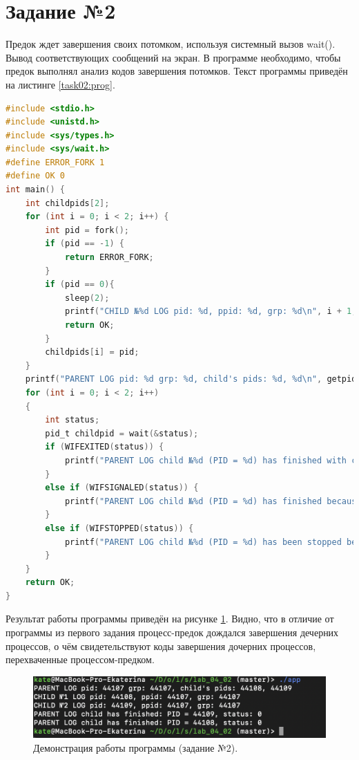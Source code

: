 \documentclass[12pt]{report}
\begin{document}
\section*{Задание №2}

Предок ждет завершения своих потомком, используя системный вызов wait(). Вывод соответствующих сообщений на экран. В программе необходимо, чтобы предок выполнял анализ кодов завершения потомков. Текст программы приведён на листинге \ref{task02:prog}.

\begin{lstlisting}[label=task02:prog,caption=Системный вызов wait(),language=C]
#include <stdio.h>
#include <unistd.h>
#include <sys/types.h>
#include <sys/wait.h>
#define ERROR_FORK 1
#define OK 0
int main() {
    int childpids[2];
    for (int i = 0; i < 2; i++) {
        int pid = fork();
        if (pid == -1) {
            return ERROR_FORK;
        }
        if (pid == 0){
            sleep(2);
            printf("CHILD №%d LOG pid: %d, ppid: %d, grp: %d\n", i + 1, getpid(), getppid(), getpgrp());
            return OK;
        }
        childpids[i] = pid;
    }
    printf("PARENT LOG pid: %d grp: %d, child's pids: %d, %d\n", getpid(), getpgrp(), childpids[0], childpids[1]);
    for (int i = 0; i < 2; i++)
    {
        int status;
        pid_t childpid = wait(&status);
        if (WIFEXITED(status)) {
            printf("PARENT LOG child №%d (PID = %d) has finished with code: %d\n", i + 1, childpid, WEXITSTATUS(status));
        }
        else if (WIFSIGNALED(status)) {
            printf("PARENT LOG child №%d (PID = %d) has finished because of signal: %d\n", i + 1, childpid, WTERMSIG(status));
        }
        else if (WIFSTOPPED(status)) {
            printf("PARENT LOG child №%d (PID = %d) has been stopped because of signal: %d\n", i + 1, childpid, WSTOPSIG(status));
        }
    }
    return OK;
}
\end{lstlisting}

Результат работы программы приведён на рисунке \ref{task02:demo}. Видно, что в отличие от программы из первого задания процесс-предок дождался завершения дечерних процессов, о чём свидетельствуют коды завершения дочерних процессов, перехваченные процессом-предком.
\begin{figure}[H]
	\centering
	\includegraphics[width=\linewidth]{task02.png}
	\caption{Демонстрация работы программы (задание №2).}
	\label{task02:demo}
\end{figure}
\end{document}

